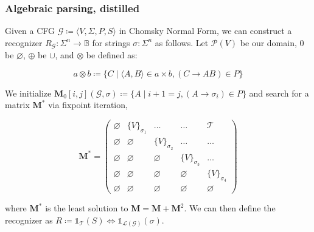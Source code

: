 \documentclass{beamer}
\begin{document}
    \begin{frame}
        \frametitle{Algebraic parsing, distilled}
        Given a CFG $\mathcal{G} \coloneqq \langle V, \Sigma, P, S\rangle$ in Chomsky Normal Form, we can construct a recognizer $R_\mathcal{G}: \Sigma^n \rightarrow \mathbb{B}$ for strings $\sigma: \Sigma^n$ as follows. Let $\mathcal P(V)$ be our domain, $0$ be $\varnothing$, $\oplus$ be $\cup$, and $\otimes$ be defined as:

        \vspace{-7pt}
        \[
            a \otimes b \coloneqq \{C \mid \langle A, B\rangle \in a \times b, (C\rightarrow AB) \in P\}
        \]

        \noindent We initialize $\mathbf{M}_0[i, j](\mathcal{G}, \sigma) \coloneqq \{A \mid i + 1 = j, (A \rightarrow \sigma_i) \in P\}$ and search for a matrix $\mathbf{M}^*$ via fixpoint iteration,

        \vspace{-5}
        \[
            \mathbf{M}^* = \begin{pmatrix}
                               \varnothing & \{V\}_{\sigma_1} & \ldots & \ldots & \mathcal{T} \\
                               \varnothing & \varnothing & \{V\}_{\sigma_2} & \ldots & \ldots \\
                               \varnothing & \varnothing & \varnothing & \{V\}_{\sigma_3} & \ldots \\
                               \varnothing & \varnothing & \varnothing & \varnothing & \{V\}_{\sigma_4} \\
                               \varnothing & \varnothing & \varnothing & \varnothing & \varnothing
            \end{pmatrix}
        \]

        \noindent where $\mathbf{M}^*$ is the least solution to $\mathbf{M} = \mathbf{M} + \mathbf{M}^2$. We can then define the recognizer as $R \coloneqq \mathds{1}_{\mathcal{T}}(S) \iff \mathds{1}_{\mathcal{L}(\mathcal{G})}(\sigma)$.
    \end{frame}
\end{document}
